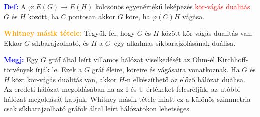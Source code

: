 \documentclass[../../szobeli.tex]{subfiles}
\begin{document}
\begin{itemize}
            \textcolor{blue}{\textbf{Def:}} A $\varphi : E(G) \rightarrow E(H)$ kölcsönös egyenértékű leképezés \textcolor{red}{kör-vágás dualitás} $G$ és $H$ között, ha $C$ pontosan akkor $G$ köre, ha $\varphi(C) H$ vágása.

            \textcolor{orange}{\textbf{Whitney másik tétele:}} Tegyük fel, hogy $G$ és $H$ között kör-vágás dualitás van. Ekkor $G$ síkbarajzolható, és $H$ a $G$ egy alkalmas síkbarajzolásának duálisa.
            
            \textcolor{blue}{\textbf{Megj:}} Egy $G$ gráf által leírt villamos hálózat viselkedését az Ohm-él Kirchhoff-törvények írják le. Ezek a $G$ gráf éleire, köreire és vágásaira vonatkoznak. Ha $G$ és $H$ közt kör-vágás dualitás van, akkor $H$-n elkészíthető az előző hálózat duálisa. Az eredeti hálózat megoldásában ha az I és U értékeket felcsréljük, az utóbbi hálózat megoldását kapjuk. Whitney másik tétele miatt ez a különös szimmetria csak síkbarajzolható gráfok által leírt hálózatokon lehetséges.

    \end{itemize}
\end{document}
